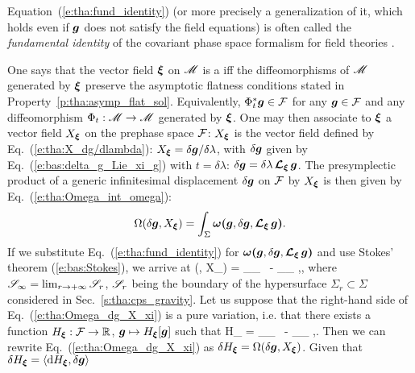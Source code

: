 \begin{remark}
Equation~(\ref{e:tha:fund_identity}) (or more precisely a generalization of it, which holds
even if $\bm{g}$ does not satisfy the field equations) is often called
the \emph{fundamental identity} of the covariant phase space formalism for field theories
\cite{HollaW13,HollaWZ24,Compe19,GrumiS22,HajiaS16}.
\end{remark}

One says that the vector field $\bm{\xi}$ on $\mathscr{M}$ is a
iff the diffeomorphisms of $\mathscr{M}$ generated
by $\bm{\xi}$ preserve the asymptotic flatness conditions stated in Property~\ref{p:tha:asymp_flat_sol}.
Equivalently, $\Phi_t^*\bm{g}\in \mathcal{F}$ for any $\bm{g}\in\mathcal{F}$ and any diffeomorphism
$\Phi_t:\mathscr{M} \to \mathscr{M}$ generated by $\bm{\xi}$.
One may then associate to $\bm{\xi}$ a vector field
$X_{\bm{\xi}}$ on the prephase space $\mathcal{F}$: $X_{\bm{\xi}}$ is the
vector field defined by Eq.~(\ref{e:tha:X_dg/dlambda}):
$X_{\bm{\xi}} = \delta\bm{g} / \delta\lambda$, with $\delta\bm{g}$ given
by Eq.~(\ref{e:bas:delta_g_Lie_xi_g}) with $t=\delta\lambda$: $\delta\bm{g} = \delta\lambda\, \bm{\mathcal{L}}_{\bm{\xi}}\, \bm{g}$.
The presymplectic product of a generic infinitesimal displacement $\delta\bm{g}$ on
$\mathcal{F}$ by $X_{\bm{\xi}}$ is then given by Eq.~(\ref{e:tha:Omega_int_omega}):
\[
    \Omega(\delta\bm{g}, X_{\bm{\xi}}) =
        \int_{\Sigma} \bm{\omega} \textbf{(}\bm{g},\delta\bm{g},\bm{\mathcal{L}}_{\bm{\xi}}\,\bm{g}\textbf{)} .
\]
If we substitute Eq.~(\ref{e:tha:fund_identity}) for $\bm{\omega} \textbf{(}\bm{g},\delta\bm{g},\bm{\mathcal{L}}_{\bm{\xi}}\,\bm{g}\textbf{)}$ and use Stokes' theorem (\ref{e:bas:Stokes}), we arrive at
\be \label{e:tha:Omega_dg_X_xi}
    \Omega(\delta{}, X_{\w{\xi}}) =
       \delta \int_{\Sp_\infty}\!\! \lld\w{\xi}\rld
    \ -  \int_{\Sp_\infty} \!\! \w{\xi}\cdot\w{\theta}\lld{},\delta{}\rld ,
\ee
where $\mathscr{S}_\infty = \lim_{r\to +\infty} \mathscr{S}_r$, $\mathscr{S}_r$ being the boundary
of the hypersurface $\Sigma_r \subset \Sigma$ considered in Sec.~\ref{s:tha:cps_gravity}.
Let us suppose that the right-hand side of Eq.~(\ref{e:tha:Omega_dg_X_xi}) is a
pure variation, i.e. that there exists a function $H_{\bm{\xi}}: \mathcal{F} \to \mathbb{R}$,
$\bm{g}\mapsto H_{\bm{\xi}}[\bm{g}]$ such that
\be \label{e:tha:delta_H_xi}
    \delta H_{\w{\xi}} = \delta \int_{\Sp_\infty}\!\! \lld\w{\xi}\rld
    \ -  \int_{\Sp_\infty} \!\! \w{\xi}\cdot\w{\theta}\lld{},\delta{}\rld .
\ee
Then we can rewrite Eq.~(\ref{e:tha:Omega_dg_X_xi}) as
$\delta H_{\bm{\xi}} = \Omega(\delta\bm{g}, X_{\bm{\xi}})$.
Given that
$\delta H_{\bm{\xi}} = \langle \mathrm{d} H_{\bm{\xi}}, \delta\bm{g} \rangle$
